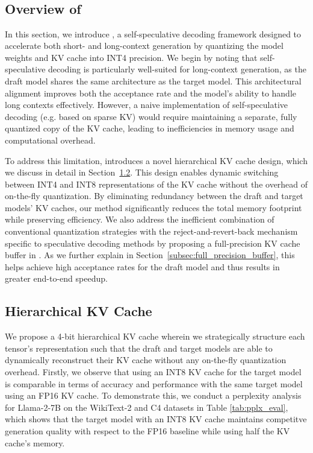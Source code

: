 \section{\OURS\ }
\subsection{Overview of \OURS}

In this section, we introduce \OURS, a self-speculative decoding framework designed to accelerate both short- and long-context generation by quantizing the model weights and KV cache into INT4 precision. We begin by noting that self-speculative decoding is particularly well-suited for long-context generation, as the draft model shares the same architecture as the target model. This architectural alignment improves both the acceptance rate and the model’s ability to handle long contexts effectively. However, a naive implementation 
of self-speculative decoding (e.g. based on sparse KV) would require maintaining a separate, fully quantized copy of the KV cache, leading to inefficiencies in memory usage and computational overhead.

To address this limitation, \OURS{} introduces a novel hierarchical KV cache design, which we discuss in detail in Section~\ref{subsec:Hierarchical_kv_cache}. This design enables dynamic switching between INT4 and INT8 representations of the KV cache without the overhead of on-the-fly quantization. By eliminating redundancy between the draft and target models' KV caches, our method significantly reduces the total memory footprint while preserving efficiency. We also address the inefficient combination of conventional quantization strategies with the reject-and-revert-back mechanism specific to speculative decoding methods by proposing a full-precision KV cache buffer in \OURS. As we further explain in Section~\ref{subsec:full_precision_buffer}, this helps achieve high acceptance rates for the draft model and thus results in greater end-to-end speedup.

\subsection{Hierarchical KV Cache}\label{subsec:Hierarchical_kv_cache}
We propose a 4-bit hierarchical KV cache wherein we strategically structure each tensor's representation such that the draft and target models are able to dynamically reconstruct their KV cache without any on-the-fly quantization overhead. Firstly, we observe that using an INT8 KV cache for the target model is comparable in terms of accuracy and performance with the same target model using an FP16 KV cache. To demonstrate this, we conduct a perplexity analysis for Llama-2-7B on the WikiText-2 \cite{merity2016pointer} and C4 \cite{raffel2020exploring} datasets in Table \ref{tab:pplx_eval}, which shows that the target model with an INT8 KV cache maintains competitve generation quality with respect to the FP16 baseline while using half the KV cache's memory.

